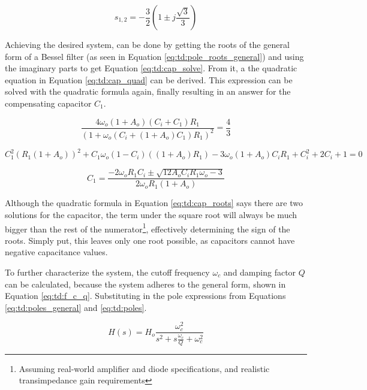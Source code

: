 \begin{equation}\label{eq:td:pole_roots_general}
	s_{1, 2} = -\frac{3}{2}(1 \pm j\frac{\sqrt{3}}{3})
\end{equation}

Achieving the desired system, can be done by getting the roots of the general form of a Bessel filter (as seen in Equation \eqref{eq:td:pole_roots_general}) and using the imaginary parts to get Equation \eqref{eq:td:cap_solve}. From it, a the quadratic equation in Equation \ref{eq:td:cap_quad} can be derived. This expression can be solved with the quadratic formula again, finally resulting in an answer for the compensating capacitor $C_1$. 

\begin{equation}\label{eq:td:cap_solve}
	\frac{4\omega_o(1 + A_o)(C_i + C_1)R_1}{(1 + \omega_o(C_i + (1 + A_o)C_1)R_1)^2} = \frac{4}{3}
\end{equation}

\begin{equation}\label{eq:td:cap_quad}
	C_1^2(R_1(1 + A_o))^2 + C_1\omega_o(1 - C_i)((1 + A_o)R_1) - 3\omega_o(1 + A_o)C_iR_1 + C_i^2 + 2C_i + 1 = 0
\end{equation}

\begin{equation}\label{eq:td:cap_roots}
	C_1 = \frac{-2\omega_oR_1C_i \pm \sqrt{12A_oC_iR_1\omega_o - 3}}{2\omega_oR_1(1 + A_o)}
\end{equation}

Although the quadratic formula in Equation \eqref{eq:td:cap_roots} says there are two solutions for the capacitor, the term under the square root will always be much bigger than the rest of the numerator\footnote{Assuming real-world amplifier and diode specifications, and realistic transimpedance gain requirements}, effectively determining the sign of the roots. Simply put, this leaves only one root possible, as capacitors cannot have negative capacitance values.

To further characterize the system, the cutoff frequency $\omega_c$ and damping factor $Q$ can be calculated, because the system adheres to the general form, shown in Equation \eqref{eq:td:f_c_q}. Substituting in the pole expressions from Equations \eqref{eq:td:poles_general} and \eqref{eq:td:poles}.

\begin{equation}\label{eq:td:f_c_q}
	H(s) = H_o\frac{\omega_c^2}{s^2 + s\frac{\omega_c}{Q} + \omega_c^2}
\end{equation}

